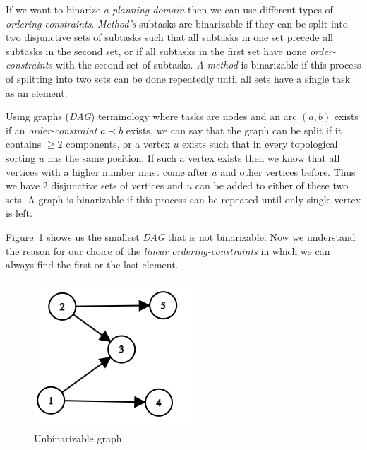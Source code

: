 \begin{example}\label{ex04:7}
    If we want to binarize \emph{a planning domain} then we can use different types of \emph{ordering-constraints}. \emph{Method's} subtasks are binarizable if they can be split into two disjunctive sets of subtasks such that all subtasks in one set precede all subtasks in the second set, or if all subtasks in the first set have none \emph{order-constraints} with the second set of subtasks. \emph{A method} is binarizable if this process of splitting into two sets can be done repeatedly until all sets have a single task as an element. 
    
    Using graphs (\emph{DAG}) terminology where tasks are nodes and an arc $(a,b)$ exists if an \emph{order-constraint} $a \prec b$ exists, we can say that the graph can be split if it contains $\geq 2$ components, or a vertex $u$ exists such that in every topological sorting $u$ has the same position. If such a vertex exists then we know that all vertices with a higher number must come after $u$ and other vertices before. Thus we have 2 disjunctive sets of vertices and $u$ can be added to either of these two sets. A graph is binarizable if this process can be repeated until only single vertex is left.

    Figure~\ref{fig04:3} shows us the smallest \emph{DAG} that is not binarizable. Now we understand the reason for our choice of the \emph{linear ordering-constraints} in which we can always find the first or the last element.
    
    \begin{figure}
        \centering
        \includegraphics{img/graph.png}
        \caption{Unbinarizable graph}
        \label{fig04:3}
    \end{figure}
\end{example}

